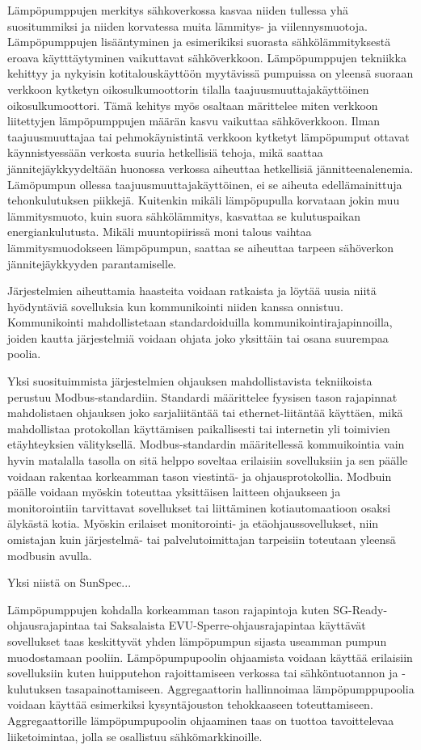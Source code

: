 Lämpöpumppujen merkitys sähkoverkossa kasvaa niiden tullessa yhä suositummiksi ja niiden korvatessa muita lämmitys- ja viilennysmuotoja. Lämpöpumppujen lisääntyminen ja esimerikiksi suorasta sähkölämmityksestä eroava käytttäytyminen vaikuttavat sähköverkkoon. Lämpöpumppujen tekniikka kehittyy ja nykyisin kotitalouskäyttöön myytävissä pumpuissa on yleensä suoraan verkkoon kytketyn oikosulkumoottorin tilalla taajuusmuuttajakäyttöinen oikosulkumoottori. Tämä kehitys myös osaltaan märittelee miten verkkoon liitettyjen lämpöpumppujen määrän kasvu vaikuttaa sähköverkkoon. Ilman taajuusmuuttajaa tai pehmokäynistintä verkkoon kytketyt lämpöpumput ottavat käynnistyessään verkosta suuria hetkellisiä tehoja, mikä saattaa jännitejäykkyydeltään huonossa verkossa aiheuttaa hetkellisiä jännitteenalenemia. Lämöpumpun ollessa taajuusmuuttajakäyttöinen, ei se aiheuta edellämainittuja tehonkulutuksen piikkejä. Kuitenkin mikäli lämpöpupulla korvataan jokin muu lämmitysmuoto, kuin suora sähkölämmitys, kasvattaa se kulutuspaikan energiankulutusta. Mikäli muuntopiirissä moni talous vaihtaa lämmitysmuodokseen lämpöpumpun, saattaa se aiheuttaa tarpeen sähöverkon jännitejäykkyyden parantamiselle.

Järjestelmien aiheuttamia haasteita voidaan ratkaista ja löytää uusia niitä hyödyntäviä sovelluksia kun kommunikointi niiden kanssa onnistuu. Kommunikointi mahdollistetaan standardoiduilla kommunikointirajapinnoilla, joiden kautta järjestelmiä voidaan ohjata joko yksittäin tai osana suurempaa poolia.

Yksi suosituimmista järjestelmien ohjauksen mahdollistavista tekniikoista perustuu Modbus-standardiin. Standardi määrittelee fyysisen tason rajapinnat mahdolistaen ohjauksen joko sarjaliitäntää tai ethernet-liitäntää käyttäen, mikä mahdollistaa protokollan käyttämisen paikallisesti tai internetin yli toimivien etäyhteyksien välityksellä. Modbus-standardin määritellessä kommuikointia vain hyvin matalalla tasolla on sitä helppo soveltaa erilaisiin sovelluksiin ja sen päälle voidaan rakentaa korkeamman tason viestintä- ja ohjausprotokollia. Modbuin päälle voidaan myöskin toteuttaa yksittäisen laitteen ohjaukseen ja monitorointiin tarvittavat sovellukset tai liittäminen kotiautomaatioon osaksi älykästä kotia. Myöskin erilaiset monitorointi- ja etäohjaussovellukset, niin omistajan kuin järjestelmä- tai palvelutoimittajan tarpeisiin toteutaan yleensä modbusin avulla.

Yksi niistä on SunSpec...

Lämpöpumppujen kohdalla korkeamman tason rajapintoja kuten SG-Ready-ohjausrajapintaa tai Saksalaista EVU-Sperre-ohjausrajapintaa käyttävät sovellukset taas keskittyvät yhden lämpöpumpun sijasta useamman pumpun muodostamaan pooliin. Lämpöpumpupoolin ohjaamista voidaan käyttää erilaisiin sovelluksiin kuten huipputehon rajoittamiseen verkossa tai sähköntuotannon ja -kulutuksen tasapainottamiseen. Aggregaattorin hallinnoimaa lämpöpumppupoolia voidaan käyttää esimerkiksi kysyntäjouston tehokkaaseen toteuttamiseen. Aggregaattorille lämpöpumpupoolin ohjaaminen taas on tuottoa tavoittelevaa liiketoimintaa, jolla se osallistuu sähkömarkkinoille.
